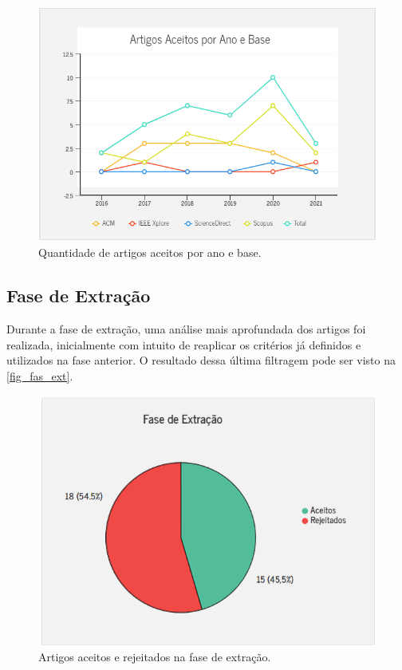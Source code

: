 \begin{figure}[htb]
  \caption{\label{fig_art_act_ano}Quantidade de artigos aceitos por ano e base.}
  \begin{center}
    \includegraphics[scale=0.85]{Imagens/msl/artigos_aceitos_ano_base.png}
  \end{center}
\end{figure}

\newpage{}

\subsection{Fase de Extração}

Durante a fase de extração, uma análise mais aprofundada dos artigos foi realizada, inicialmente com intuito de reaplicar os critérios já definidos e utilizados na fase anterior.
O resultado dessa última filtragem pode ser visto na \autoref{fig_fas_ext}.

\begin{figure}[htb]
  \caption{\label{fig_fas_ext}Artigos aceitos e rejeitados na fase de extração.}
  \begin{center}
    \includegraphics[scale=0.85]{Imagens/msl/fase_extracao_artigos.png}
  \end{center}
\end{figure}

